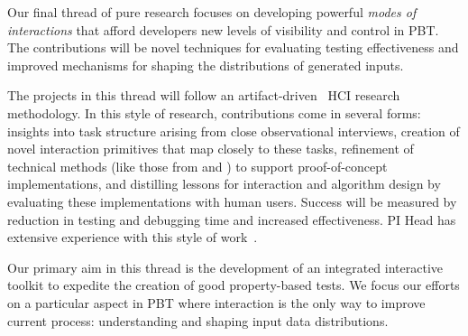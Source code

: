 

Our final thread of pure research focuses on developing powerful
\emph{modes of interactions} that afford developers new levels of visibility and control in PBT. The contributions will be novel techniques for evaluating testing effectiveness and improved mechanisms for shaping the distributions of generated inputs.

%
%

The projects in this thread
 will follow an
artifact-driven~\cite{ref:wobbrock2016research} HCI research methodology.
In this style of research, contributions come in several forms: insights into task
structure arising from close observational interviews, creation of novel
interaction primitives that map closely to these tasks, refinement of
technical methods (like those from  and
) to support proof-of-concept implementations,
and distilling
lessons for interaction and algorithm design by evaluating these
implementations
with human users. Success will be measured by
reduction in
testing and debugging time and increased effectiveness.
PI Head has extensive experience with this style of work~\cite{ref:head2015tutorons,ref:suzuki2017tracediff,ref:head2017writing,ref:head2018when,ref:head2018interactive,ref:head2019managing,ref:head2020composing}.

%
Our primary aim in this thread is the development of an integrated interactive toolkit to expedite the creation of good property-based tests. We focus our efforts on a particular aspect in PBT where interaction is the only way to improve current process: understanding and shaping input data distributions.

